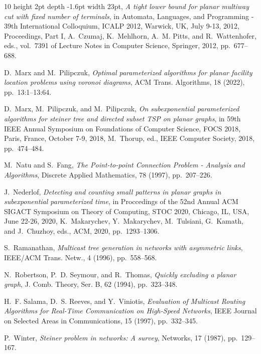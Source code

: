 \documentclass[a4paper,11pt]{article}
\theoremstyle{plain}
\newtheorem{identification rule}{Identification Rule}
\theoremstyle{definition}
\theoremstyle{remark}
\begin{document}
\begin{thebibliography}{10}
\leavevmode\vrule height 2pt depth -1.6pt width 23pt, {\em A tight lower bound
  for planar multiway cut with fixed number of terminals}, in Automata,
  Languages, and Programming - 39th International Colloquium, {ICALP} 2012,
  Warwick, UK, July 9-13, 2012, Proceedings, Part {I}, A.~Czumaj, K.~Mehlhorn,
  A.~M. Pitts, and R.~Wattenhofer, eds., vol.~7391 of Lecture Notes in Computer
  Science, Springer, 2012, pp.~677--688.

{\sc D.~Marx and M.~Pilipczuk}, {\em Optimal parameterized algorithms for
  planar facility location problems using voronoi diagrams}, {ACM} Trans.
  Algorithms, 18 (2022), pp.~13:1--13:64.

{\sc D.~Marx, M.~Pilipczuk, and M.~Pilipczuk}, {\em On subexponential
  parameterized algorithms for steiner tree and directed subset {TSP} on planar
  graphs}, in 59th {IEEE} Annual Symposium on Foundations of Computer Science,
  {FOCS} 2018, Paris, France, October 7-9, 2018, M.~Thorup, ed., {IEEE}
  Computer Society, 2018, pp.~474--484.

{\sc M.~Natu and S.~Fang}, {\em {The Point-to-point Connection Problem -
  Analysis and Algorithms}}, Discrete Applied Mathematics, 78 (1997),
  pp.~207--226.

{\sc J.~Nederlof}, {\em Detecting and counting small patterns in planar graphs
  in subexponential parameterized time}, in Proccedings of the 52nd Annual
  {ACM} {SIGACT} Symposium on Theory of Computing, {STOC} 2020, Chicago, IL,
  USA, June 22-26, 2020, K.~Makarychev, Y.~Makarychev, M.~Tulsiani, G.~Kamath,
  and J.~Chuzhoy, eds., {ACM}, 2020, pp.~1293--1306.

{\sc S.~Ramanathan}, {\em Multicast tree generation in networks with asymmetric
  links}, {IEEE/ACM} Trans. Netw., 4 (1996), pp.~558--568.

{\sc N.~Robertson, P.~D. Seymour, and R.~Thomas}, {\em Quickly excluding a
  planar graph}, J. Comb. Theory, Ser. {B}, 62 (1994), pp.~323--348.

{\sc H.~F. Salama, D.~S. Reeves, and Y.~Viniotis}, {\em {Evaluation of
  Multicast Routing Algorithms for Real-Time Communication on High-Speed
  Networks}}, {IEEE} Journal on Selected Areas in Communications, 15 (1997),
  pp.~332--345.

{\sc P.~Winter}, {\em {Steiner problem in networks: {A} survey}}, Networks, 17
  (1987), pp.~129--167.

\end{thebibliography}
\end{document}
